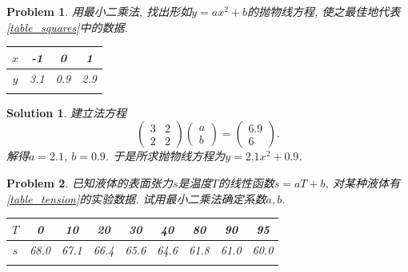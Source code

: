 \documentclass[a4paper, 12pt]{ctexart}
\let\oldtable\table
\let\oldendtable\endtable
\renewenvironment{table}
    {\par\nolinenumbers\oldtable}
    {\oldendtable\endnolinenumbers\par}
\theoremstyle{plain}
\newtheorem{problem}{Problem}[section]
\theoremstyle{plain}
\theoremstyle{plain}
\theoremstyle{nonumberplain}
\newtheorem{solution}{Solution}
\begin{document}
    \begin{problem}
        \label{problem_squares}
        用最小二乘法, 找出形如$y=ax^{2}+b$的抛物线方程,
        使之最佳地代表\ref{table_squares}中的数据.
        
        \begin{table}[H]
            \begin{center}
                \caption{习题\ref{problem_squares}中给定的拟合数据}
                \label{table_squares}
                \begin{tabular}{cccc}
                    \Xhline{1.2pt}
                    $x$ & -1 & 0 & 1\\
                    \hline
                    $y$ & 3.1 & 0.9 & 2.9\\
                    \Xhline{1.2pt}
                \end{tabular}
            \end{center}
        \end{table}
    \end{problem}

    \begin{solution}
        建立法方程
        \begin{equation}
            \begin{pmatrix}
                3 & 2\\ 2 & 2
            \end{pmatrix}
            \begin{pmatrix}
                a \\ b
            \end{pmatrix}
            =
            \begin{pmatrix}
                6.9 \\ 6
            \end{pmatrix}
            .
        \end{equation}
        解得$a = 2.1$, $b = 0.9$. 于是所求抛物线方程为$y=2.1x^{2}+0.9$.
    \end{solution}

    \begin{problem}
        已知液体的表面张力$s$是温度$T$的线性函数$s=aT+b$,
        对某种液体有\ref{table_tension}的实验数据. 试用最小二乘法确定系数$a, b$.
        \begin{table}[H]
            \begin{center}
                \caption{表面张力--温度数据}
                \label{table_tension}
                \begin{tabular}{ccccccccc}
                    \Xhline{1.2pt}
                    $T$ & 0 & 10 & 20 & 30 & 40 & 80 & 90 & 95\\
                    \hline
                    $s$ & 68.0 & 67.1 & 66.4 & 65.6 & 64.6 & 61.8 & 61.0 & 60.0\\
                    \Xhline{1.2pt}
                \end{tabular}
            \end{center}
        \end{table}
    \end{problem}
\end{document}
